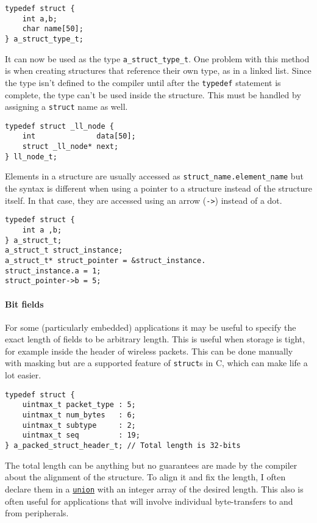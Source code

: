 \documentclass[10pt]{article}
\begin{document}
\begin{lstlisting}[label=lst-typedef-struct,caption=Typedef structure]
typedef struct {
	int a,b;
	char name[50];
} a_struct_type_t;
\end{lstlisting}
It can now be used as the type \texttt{a\_struct\_type\_t}. One problem with this method is when creating structures that reference their own type, as in a linked list. Since the type isn't defined to the compiler until after the \texttt{typedef} statement is complete, the type can't be used inside the structure. This must be handled by assigning a \texttt{struct} name as well.
\begin{lstlisting}[label=lst-recursive-struct,caption=Recursive structures]
typedef struct _ll_node {
	int              data[50];
	struct _ll_node* next;
} ll_node_t;
\end{lstlisting}
Elements in a structure are usually accessed as \texttt{struct\_name.element\_name} but the syntax is different when using a pointer to a structure instead of the structure itself. In that case, they are accessed using an arrow (\texttt{->}) instead of a dot.
\begin{lstlisting}[label=lst-struct-member,caption=Structure member access]
typedef struct {
	int a ,b;
} a_struct_t;
a_struct_t struct_instance;
a_struct_t* struct_pointer = &struct_instance.
struct_instance.a = 1;
struct_pointer->b = 5;
\end{lstlisting}

\paragraph{Bit fields}
For some (particularly embedded) applications it may be useful to specify the exact length of fields to be arbitrary length. This is useful when storage is tight, for example inside the header of wireless packets. This can be done manually with masking but are a supported feature of \texttt{struct}s in C, which can make life a lot easier.
\begin{lstlisting}[label=lst-struct-bitfield,caption=Structure bit fields]
typedef struct {
	uintmax_t packet_type : 5;
	uintmax_t num_bytes   : 6;
	uintmax_t subtype     : 2;
	uintmax_t seq         : 19;
} a_packed_struct_header_t; // Total length is 32-bits
\end{lstlisting}

The total length can be anything but no guarantees are made by the compiler about the alignment of the structure. To align it and fix the length, I often declare them in a \hyperref[sec:unions]{\texttt{union}} with an integer array of the desired length. This also is often useful for applications that will involve individual byte-transfers to and from peripherals. \\
\end{document}
